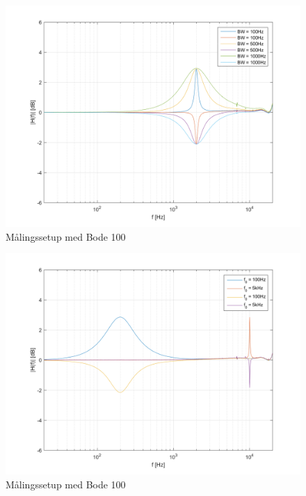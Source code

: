 \begin{figure}[h!]
	\centering
	\includegraphics[scale = 0.8]{billeder/Bandwith_uden_hotfix}
	\caption{Målingssetup med Bode 100}
	\label{fig:Bandwith_uden_hotfix}
\end{figure}

\begin{figure}[h!]
	\centering
	\includegraphics[scale = 0.8]{billeder/Frekvensplacering_uden_hotfix}
	\caption{Målingssetup med Bode 100}
	\label{fig:Frekvensplacering_uden_hotfix}
\end{figure}

